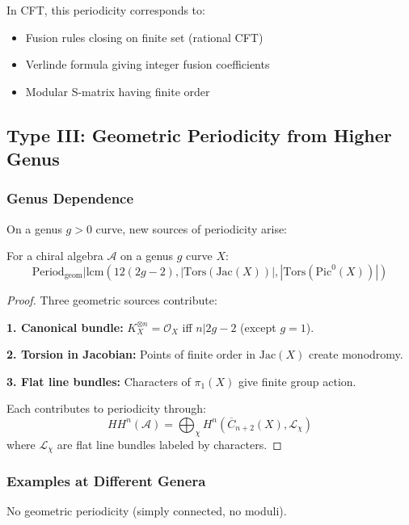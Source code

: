 In CFT, this periodicity corresponds to:
\begin{itemize}
\item Fusion rules closing on finite set (rational CFT)
\item Verlinde formula giving integer fusion coefficients
\item Modular S-matrix having finite order
\end{itemize}

\subsection{Type III: Geometric Periodicity from Higher Genus}

\subsubsection{Genus Dependence}

On a genus $g > 0$ curve, new sources of periodicity arise:

\begin{theorem}
For a chiral algebra $\mathcal{A}$ on a genus $g$ curve $X$:
\[
\text{Period}_{\text{geom}} | \text{lcm}(12(2g-2), |\text{Tors}(\text{Jac}(X))|, |\text{Tors}(\text{Pic}^0(X))|)
\]
\end{theorem}

\begin{proof}
Three geometric sources contribute:

\textbf{1. Canonical bundle:} $K_X^{\otimes n} = \mathcal{O}_X$ iff $n | 2g-2$ (except $g=1$).

\textbf{2. Torsion in Jacobian:} Points of finite order in $\text{Jac}(X)$ create monodromy.

\textbf{3. Flat line bundles:} Characters of $\pi_1(X)$ give finite group action.

Each contributes to periodicity through:
\[
HH^n(\mathcal{A}) = \bigoplus_{\chi} H^n(\overline{C}_{n+2}(X), \mathcal{L}_{\chi})
\]
where $\mathcal{L}_{\chi}$ are flat line bundles labeled by characters.
\end{proof}

\subsubsection{Examples at Different Genera}

\begin{example}
No geometric periodicity (simply connected, no moduli).
\end{example}


